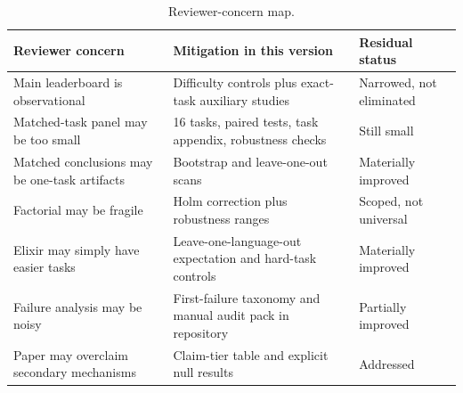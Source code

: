 \documentclass[11pt]{article}
\begin{document}
\begin{table}[H]
\centering
\caption{Reviewer-concern map.}
\label{tab:reviewer}
\small
\begin{tabularx}{\textwidth}{X X X}
\toprule
Reviewer concern & Mitigation in this version & Residual status \\
\midrule
Main leaderboard is observational & Difficulty controls plus exact-task auxiliary studies & Narrowed, not eliminated \\
Matched-task panel may be too small & 16 tasks, paired tests, task appendix, robustness checks & Still small \\
Matched conclusions may be one-task artifacts & Bootstrap and leave-one-out scans & Materially improved \\
Factorial may be fragile & Holm correction plus robustness ranges & Scoped, not universal \\
Elixir may simply have easier tasks & Leave-one-language-out expectation and hard-task controls & Materially improved \\
Failure analysis may be noisy & First-failure taxonomy and manual audit pack in repository & Partially improved \\
Paper may overclaim secondary mechanisms & Claim-tier table and explicit null results & Addressed \\
\bottomrule
\end{tabularx}
\end{table}
\end{document}
